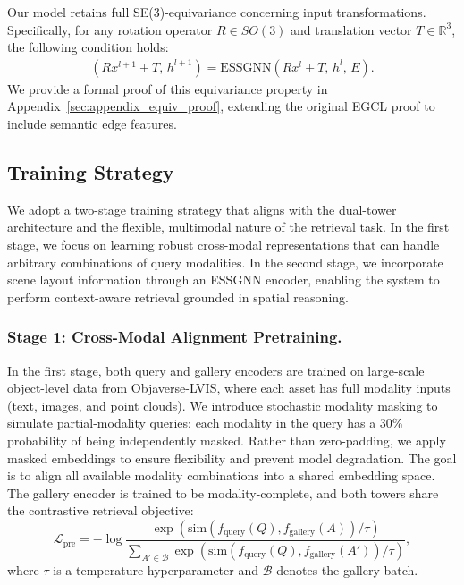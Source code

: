 Our model retains full SE(3)-equivariance concerning input transformations. Specifically, for any rotation operator \( R \in SO(3) \) and translation vector \( T \in \mathbb{R}^3 \), the following condition holds:
\begin{align}
    (R x^{l+1} + T,\, h^{l+1}) = \text{ESSGNN}(R x^l + T,\, h^l,\, E). \label{eq:EGCL_equivariance}
\end{align}
We provide a formal proof of this equivariance property in Appendix~\ref{sec:appendix_equiv_proof}, extending the original EGCL proof to include semantic edge features.


\subsection{Training Strategy}
We adopt a two-stage training strategy that aligns with the dual-tower architecture and the flexible, multimodal nature of the retrieval task. In the first stage, we focus on learning robust cross-modal representations that can handle arbitrary combinations of query modalities. In the second stage, we incorporate scene layout information through an ESSGNN encoder, enabling the system to perform context-aware retrieval grounded in spatial reasoning.
\subsubsection*{Stage 1: Cross-Modal Alignment Pretraining.}
In the first stage, both query and gallery encoders are trained on large-scale object-level data from Objaverse-LVIS, where each asset has full modality inputs (text, images, and point clouds). We introduce stochastic modality masking to simulate partial-modality queries: each modality in the query has a 30\% probability of being independently masked. Rather than zero-padding, we apply masked embeddings to ensure flexibility and prevent model degradation. The goal is to align all available modality combinations into a shared embedding space. The gallery encoder is trained to be modality-complete, and both towers share the contrastive retrieval objective:
\begin{equation}
    \mathcal{L}_{\text{pre}} = -\log \frac{\exp(\text{sim}(f_{\text{query}}(Q), f_{\text{gallery}}(A)) / \tau)}{\sum_{A' \in \mathcal{B}} \exp(\text{sim}(f_{\text{query}}(Q), f_{\text{gallery}}(A')) / \tau)},
\end{equation}
where \( \tau \) is a temperature hyperparameter and \( \mathcal{B} \) denotes the gallery batch. 

